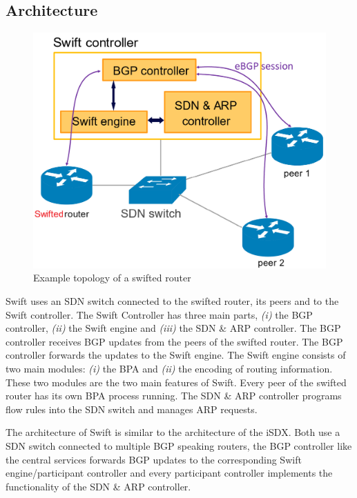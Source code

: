 \newpage

\subsection{\label{chapter2:Swift:Architecture_SWift}Architecture}

\begin{figure}[h]
\center
\includegraphics[scale = 0.3]{Figures/swift_topo_cropped.pdf}
\caption{Example topology of a swifted router \cite{swift}}
\end{figure}

Swift uses an SDN switch connected to the swifted router, its peers and to the Swift controller. The Swift Controller has three main parts, \emph{(i)} the BGP controller, \emph{(ii)} the Swift engine and \emph{(iii)} the SDN \& ARP controller. The BGP controller receives BGP updates from the peers of the swifted router. The BGP controller forwards the updates to the Swift engine. The Swift engine consists of two main modules: \emph{(i)} the BPA and \emph{(ii)} the encoding of routing information. These two modules are the two main features of Swift. Every peer of the swifted router has its own BPA process running. The SDN \& ARP controller programs flow rules into the SDN switch and manages ARP requests. 

The architecture of Swift is similar to the architecture of the iSDX. Both use a SDN switch connected to multiple BGP speaking routers, the BGP controller like the central services forwards BGP updates to the corresponding Swift engine/participant controller and every participant controller implements the functionality of the SDN \& ARP controller. 








